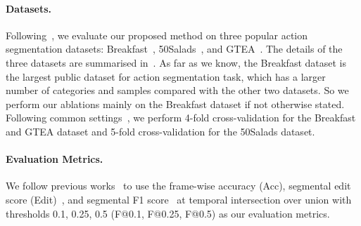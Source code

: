 \documentclass[final]{cvpr}
\newcommand{\myPara}[1]{\vspace{-.12in}\paragraph{#1}}
\begin{document}
\myPara{Datasets.} 
Following~\cite{farha2019ms,MS-TCN-PAMI20,wangboundary,chen2020action},
we evaluate our proposed method on three popular action segmentation datasets:
Breakfast~\cite{kuehne2014language}, 50Salads~\cite{stein2013combining}, and GTEA~\cite{fathi2011learning}. 
The details of the three datasets are summarised in~.
As far as we know, the Breakfast dataset is the 
largest public dataset for action segmentation task, which has a larger number of categories and samples
compared with the other two datasets.
So we perform our ablations mainly on the Breakfast dataset if not otherwise stated.
Following common settings~\cite{farha2019ms,MS-TCN-PAMI20,wangboundary,chen2020action}, 
we perform 4-fold cross-validation
for the Breakfast and GTEA dataset and 5-fold cross-validation for the 50Salads dataset.

\myPara{Evaluation Metrics.}
We follow previous works~\cite{farha2019ms,MS-TCN-PAMI20,wangboundary,chen2020action} 
to use the frame-wise accuracy (Acc), segmental edit score (Edit)~\cite{lea2017temporal},
and segmental F1 score~\cite{li2015convolutional} at temporal intersection over union with thresholds 0.1, 0.25, 0.5 (F@0.1, F@0.25, F@0.5)
as our evaluation metrics.
\end{document}
